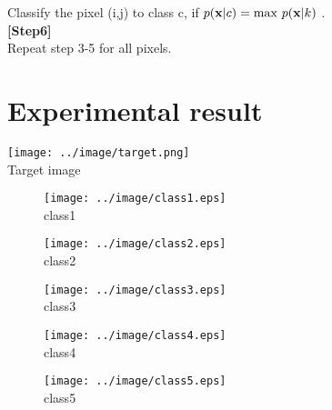 \documentclass{jarticle}
\begin{document}
Classify the pixel (i,j) to class c, if $p(\mathbf{x}|c) = {\rm max} \ p(\mathbf{x}|k)$ .\\

{\bf [Step6]}\\

Repeat step 3-5 for all pixels.

\section{Experimental result}

\begin{center}
  \texttt{[image: ../image/target.png]} \\
  Target image
\end{center}

\newpage

\begin{figure}[htbp]
  \begin{minipage}{0.3\hsize}
   \begin{center}
    \texttt{[image: ../image/class1.eps]} \\
    class1
   \end{center}
  \end{minipage}
  \begin{minipage}{0.3\hsize}
   \begin{center}
    \texttt{[image: ../image/class2.eps]} \\
    class2
   \end{center}
  \end{minipage}
  \begin{minipage}{0.3\hsize}
    \begin{center}
     \texttt{[image: ../image/class3.eps]} \\
     class3
    \end{center}
   \end{minipage}
 \end{figure}
 
 \begin{figure}[htbp]
  \begin{minipage}{0.3\hsize}
   \begin{center}
    \texttt{[image: ../image/class4.eps]} \\
    class4
   \end{center}
  \end{minipage}
  \begin{minipage}{0.3\hsize}
   \begin{center}
    \texttt{[image: ../image/class5.eps]} \\
    class5
   \end{center}
  \end{minipage}
 \end{figure}
\end{document}
